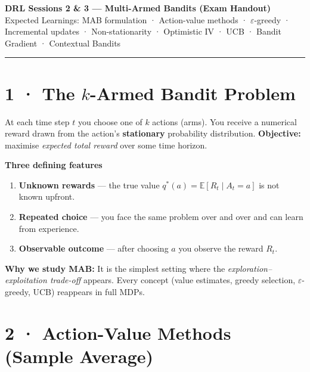 \documentclass[11pt,a4paper]{article}
\newcommand{\E}{\mathbb{E}}
\begin{document}
\begin{center}
  {\large\bfseries DRL Sessions 2 \& 3 — Multi-Armed Bandits (Exam Handout)}\\[2pt]
  {\small Expected Learnings: MAB formulation · Action-value methods · $\varepsilon$-greedy ·
  Incremental updates · Non-stationarity · Optimistic IV · UCB · Bandit Gradient · Contextual Bandits}
\end{center}
\hrule\vspace{6pt}

\section*{1 · The \(k\)-Armed Bandit Problem}

\begin{tcolorbox}[defn={Formal Definition}]
At each time step $t$ you choose one of $k$ actions (arms). You receive a numerical reward
drawn from the action's \textbf{stationary} probability distribution.
\textbf{Objective:} maximise \emph{expected total reward} over some time horizon.
\end{tcolorbox}

\textbf{Three defining features}
\begin{enumerate}
  \item \textbf{Unknown rewards} — the true value $q^*(a) = \E[R_t \mid A_t = a]$ is not known upfront.
  \item \textbf{Repeated choice} — you face the same problem over and over and can learn from experience.
  \item \textbf{Observable outcome} — after choosing $a$ you observe the reward $R_t$.
\end{enumerate}

\textbf{Why we study MAB:} It is the simplest setting where the \emph{exploration–exploitation trade-off}
appears. Every concept (value estimates, greedy selection, $\varepsilon$-greedy, UCB) reappears
in full MDPs.

\section*{2 · Action-Value Methods (Sample Average)}
\end{document}
